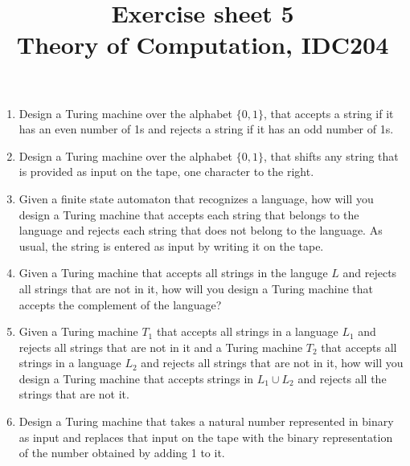 \documentclass[a4paper]{article}
\title{Exercise sheet 5\\ {\small Theory of Computation, IDC204} }
\date{}
\begin{document}
\maketitle
\begin{enumerate}
\item
  Design a Turing machine over the alphabet {\(\{0, 1\}\)}, that accepts
  a string if it has an even number of 1s and rejects a string if it has
  an odd number of 1s.
\item
  Design a Turing machine over the alphabet {\(\{0, 1\}\)}, that shifts
  any string that is provided as input on the tape, one character to the
  right.
\item
  Given a finite state automaton that recognizes a language, how will
  you design a Turing machine that accepts each string that belongs to
  the language and rejects each string that does not belong to the
  language. As usual, the string is entered as input by writing it on
  the tape.
\item
  Given a Turing machine that accepts all strings in the languge {\(L\)}
  and rejects all strings that are not in it, how will you design a
  Turing machine that accepts the complement of the language?
\item
  Given a Turing machine {\(T_1\)} that accepts all strings in a
  language {\(L_1\)} and rejects all strings that are not in it and a
  Turing machine {\(T_2\)} that accepts all strings in a language
  {\(L_2\)} and rejects all strings that are not in it, how will you
  design a Turing machine that accepts strings in {\(L_1 \cup L_2\)} and
  rejects all the strings that are not it.
\item
  Design a Turing machine that takes a natural number represented in
  binary as input and replaces that input on the tape with the binary
  representation of the number obtained by adding 1 to it.
\end{enumerate}
\end{document}
